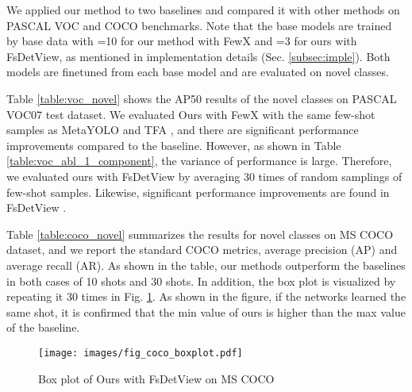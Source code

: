 \documentclass[10pt,twocolumn,letterpaper]{article}
\begin{document}
We applied our method to two baselines \cite{fan2020fsod, xiao2020few} and compared it with other methods on PASCAL VOC and COCO benchmarks. Note that the base models are trained by base data with =10 for our method with FewX and =3 for ours with FsDetView, as mentioned in implementation details (Sec. \ref{subsec:imple}). Both models are finetuned from each base model and are evaluated on novel classes.

\vspace{+0.15cm}
\quad Table \ref{table:voc_novel} shows the AP50 results of the novel classes on PASCAL VOC07 test dataset. We evaluated Ours with FewX \cite{fan2020fsod} with the same few-shot samples as MetaYOLO \cite{kang2019few} and TFA \cite{wang2020frustratingly}, and there are significant performance improvements compared to the baseline. However, as shown in Table \ref{table:voc_abl_1_component}, the variance of performance is large. Therefore, we evaluated ours with FsDetView \cite{xiao2020few} by averaging 30 times of random samplings of few-shot samples. Likewise, significant performance improvements are found in FsDetView \cite{xiao2020few}.

\vspace{+0.15cm}
\quad Table \ref{table:coco_novel} summarizes the results for novel classes on MS COCO dataset, and we report the standard COCO metrics, average precision (AP) and average recall (AR). As shown in the table, our methods outperform the baselines in both cases of 10 shots and 30 shots. In addition, the box plot is visualized by repeating it 30 times in Fig. \ref{fig:coco_box_plot}. As shown in the figure, if the networks learned the same shot, it is confirmed that the min value of ours is higher than the max value of the baseline.

\begin{figure}
    \centering
    \texttt{[image: images/fig\_coco\_boxplot.pdf]}
    \vspace{-0.3cm}
    \caption{Box plot of Ours with FsDetView on MS COCO}
    \label{fig:coco_box_plot}
\end{figure}
\end{document}
